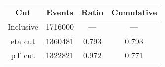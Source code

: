 \begin{tabular}{|c||c|c|c|}
\hline
Cut & Events & Ratio & Cumulative \\\hline
Inclusive & 1716000 & — & — \\
eta cut & 1360481 & 0.793 & 0.793 \\
pT cut & 1322821 & 0.972 & 0.771 \\
\hline
\end{tabular}
